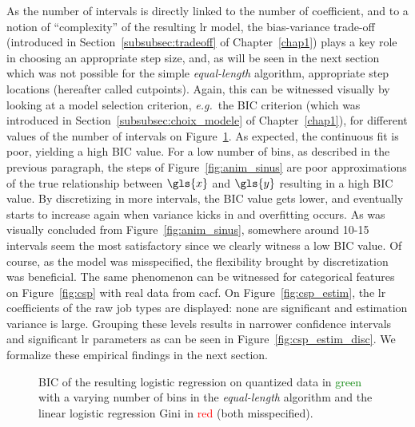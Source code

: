 As the number of intervals is directly linked to the number of coefficient, and to a notion of ``complexity'' of the resulting \gls{lr} model, the bias-variance trade-off (introduced in Section~\ref{subsubsec:tradeoff} of Chapter~\ref{chap1}) plays a key role in choosing an appropriate step size, and, as will be seen in the next section which was not possible for the simple \textit{equal-length} algorithm, appropriate step locations (hereafter called cutpoints). Again, this can be witnessed visually by looking at a model selection criterion, \textit{e.g.}\ the BIC criterion (which was introduced in Section~\ref{subsubsec:choix_modele} of Chapter~\ref{chap1}), for different values of the number of intervals on Figure~\ref{fig:bic_sin}. As expected, the continuous fit is poor, yielding a high BIC value. For a low number of bins, as described in the previous paragraph, the steps of Figure~\ref{fig:anim_sinus} are poor approximations of the true relationship between $\gls{x}$ and $\gls{y}$ resulting in a high BIC value. By discretizing in more intervals, the BIC value gets lower, and eventually starts to increase again when variance kicks in and overfitting occurs. As was visually concluded from Figure~\ref{fig:anim_sinus}, somewhere around 10-15 intervals seem the most satisfactory since we clearly witness a low BIC value. Of course, as the model was misspecified, the flexibility brought by discretization was beneficial. The same phenomenon can be witnessed for categorical features on Figure~\ref{fig:csp} with real data from \gls{cacf}. On Figure~\ref{fig:csp_estim}, the \gls{lr} coefficients of the raw job types are displayed: none are significant and estimation variance is large. Grouping these levels results in narrower confidence intervals and significant \gls{lr} parameters as can be seen in Figure~\ref{fig:csp_estim_disc}.
We formalize these empirical findings in the next section.



\begin{figure}[!ht]
\centering \resizebox{.8\textwidth}{!}{}
\caption{\label{fig:bic_sin} BIC of the resulting logistic regression on quantized data in \textcolor{green}{green} with a varying number of bins in the \textit{equal-length} algorithm and the linear logistic regression Gini in \textcolor{red}{red} (both misspecified).}
\end{figure}


